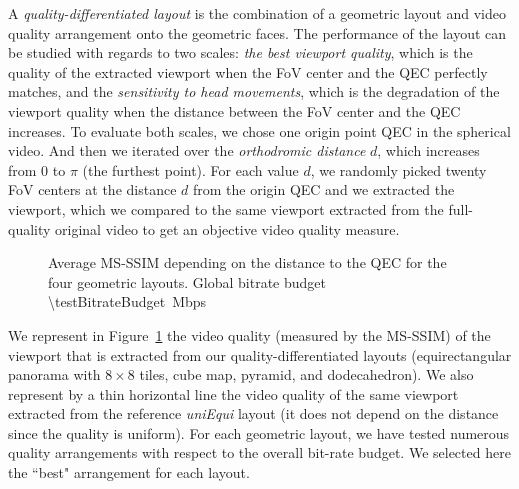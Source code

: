 
A \textit{quality-differentiated layout} is the combination of a geometric layout and video quality
arrangement onto the geometric faces. The performance of the layout can be studied with
regards to two scales: \emph{the best viewport quality}, which is the quality of the extracted viewport
when the FoV center and the QEC perfectly matches, and the \emph{sensitivity to head movements},
which is the degradation of the viewport quality when the distance between the FoV center
and the QEC increases.
To evaluate both scales, we chose one origin point \ac{QEC} in the spherical video. And then we iterated
over the \emph{orthodromic distance} $d$, which increases from $0$ to $\pi$ (the furthest point). For each
value $d$, we randomly picked twenty \ac{FoV} centers at the distance $d$ from the origin \ac{QEC}
and we extracted the viewport, which we compared to the same viewport extracted from the
full-quality original video to get an objective video quality measure.

\begin{figure}
    
       \caption{Average \acs{MS-SSIM} depending on the distance to the \acs{QEC} for the four geometric layouts. Global bitrate budget \SI{\testBitrateBudget}{\mega bps}}
    \label{fig:dist_quality_psnr}
\end{figure}


We represent in Figure~\ref{fig:dist_quality_psnr} the video quality (measured by the \acs{MS-SSIM})
of the viewport that is extracted from our quality-differentiated layouts (equirectangular
panorama with $8\!\times\! 8$ tiles, cube map, pyramid, and dodecahedron). We also represent by
a thin horizontal line the video quality of the same viewport extracted from
the reference \textit{uniEqui} layout (it does not depend on the distance since the quality 
is uniform). For each geometric layout, we have tested
numerous quality arrangements with respect to the overall bit-rate budget. We selected
here the ``best" arrangement for each layout.

